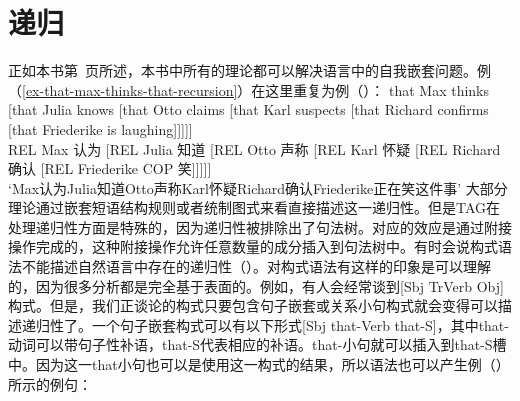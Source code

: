 \section{递归}
\label{sec-recursion}

正如本书第~\pageref{ex-that-max-thinks-that-recursion}页所述，本书中所有的理论都可以解决语言中的自我嵌套问题。例（\ref{ex-that-max-thinks-that-recursion}）在这里重复为例（）：
\ea
\label{ex-that-max-thinks-that-recursion-two}
\gll that Max thinks [that Julia knows [that Otto claims [that Karl suspects [that Richard confirms [that Friederike is laughing]]]]]\\
	REL Max 认为 [REL Julia 知道 [REL Otto 声称 [REL Karl 怀疑 [REL Richard 确认 [REL Friederike COP 笑]]]]]\\
\glt `Max认为Julia知道Otto声称Karl怀疑Richard确认Friederike正在笑这件事'
\z
大部分理论通过嵌套短语结构规则或者统制图式来看直接描述这一递归性。但是TAG\indextagc 在处理递归性方面是特殊的，因为递归性被排除出了句法树。对应的效应是通过附接操作完成的，这种附接操作允许任意数量的成分插入到句法树中。有时会说构式语法\indexcxgc 不能描述自然语言中存在的递归性（\egc \citealp[]{Leiss2009a}）。对构式语法有这样的印象是可以理解的，因为很多分析都是完全基于表面的。例如，有人会经常谈到[Sbj TrVerb Obj]构式。但是，我们正谈论的构式只要包含句子嵌套或关系小句构式就会变得可以描述递归性了。一个句子嵌套构式可以有以下形式[Sbj that-Verb that-S]，其中that-动词可以带句子性补语，that-S代表相应的补语。that-小句就可以插入到that-S槽中。因为这一that小句也可以是使用这一构式的结果，所以语法也可以产生例（）所示的例句：
